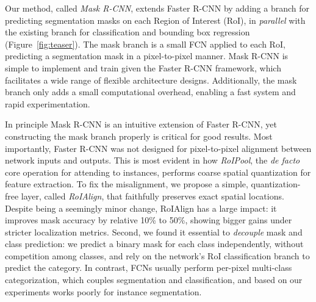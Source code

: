 Our method, called \emph{Mask R-CNN}, extends Faster R-CNN by adding a branch for predicting segmentation masks on each Region of Interest (RoI), in \emph{parallel} with the existing branch for classification and bounding box regression (Figure~\ref{fig:teaser}). The mask branch is a small FCN applied to each RoI, predicting a segmentation mask in a pixel-to-pixel manner. Mask R-CNN is simple to implement and train given the Faster R-CNN framework, which facilitates a wide range of flexible architecture designs. Additionally, the mask branch only adds a small computational overhead, enabling a fast system and rapid experimentation.

In principle Mask R-CNN is an intuitive extension of Faster R-CNN, yet constructing the mask branch properly is critical for good results. Most importantly, Faster R-CNN was not designed for pixel-to-pixel alignment between network inputs and outputs. This is most evident in how \emph{RoIPool}, the \emph{de facto} core operation for attending to instances, performs coarse spatial quantization for feature extraction. To fix the misalignment, we propose a simple, quantization-free layer, called \emph{RoIAlign}, that faithfully preserves exact spatial locations. Despite being a seemingly minor change, RoIAlign has a large impact: it improves mask accuracy by relative 10\% to 50\%, showing bigger gains under stricter localization metrics. Second, we found it essential to \emph{decouple} mask and class prediction: we predict a binary mask for each class independently, without competition among classes, and rely on the network's RoI classification branch to predict the category. In contrast, FCNs usually perform per-pixel multi-class categorization, which couples segmentation and classification, and based on our experiments works poorly for instance segmentation.

